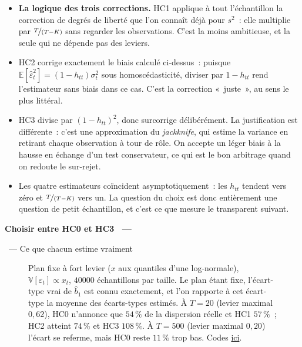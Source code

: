 \documentclass[10pt,a4paper]{article}
\makeatletter
\newcommand{\coursfile}{chapitre-4}
\newcommand{\HEAD}{HEAD}%
\newcommand{\repourl}{https://github.com/stepan-a/econometrics}
\newcommand{\coderef}[1]{\href{\repourl/blob/\HEAD/routines/\coursfile/#1}{ici}}
\theoremstyle{definition}
\renewcommand{\newline}{\unskip\par\vspace{1.5pt}}
\newenvironment{frame}[1][]{\par}{\par}
\newcommand{\frameheadrule}{%
  \par\nobreak\vspace{1pt}{\color{ctitle}\hrule height 0.6pt}\nobreak\vspace{4pt}}
\newcommand{\frametitle}[1]{%
  \par\addvspace{8pt plus 2pt}\needspace{6\baselineskip}%
  \noindent\begingroup\color{ctitle}\sffamily\bfseries\large #1\endgroup
  \@ifnextchar\framesubtitle{}{\frameheadrule}}
\newcommand{\framesubtitle}[1]{%
  \begingroup\color{ctitle}\sffamily\normalsize\ --- #1\endgroup\frameheadrule}
\makeatother
\begin{document}
\begin{notes}

  \begin{itemize}

  \item \textbf{La logique des trois corrections.} HC1 applique à tout
    l'échantillon la correction de degrés de liberté que l'on connaît déjà pour
    $s^2$~: elle multiplie par $\nicefrac{T}{(T-K)}$ sans regarder les
    observations. C'est la moins ambitieuse, et la seule qui ne dépende pas des
    leviers.\newline

  \item HC2 corrige exactement le biais calculé ci-dessus~: puisque
    $\mathbb E[\hat\varepsilon_t^2] = (1-h_{tt})\sigma_t^2$ sous
    homoscédasticité, diviser par $1-h_{tt}$ rend l'estimateur sans biais dans
    ce cas. C'est la correction «~juste~», au sens le plus littéral.\newline

  \item HC3 divise par $(1-h_{tt})^2$, donc surcorrige délibérément. La
    justification est différente~: c'est une approximation du \emph{jackknife},
    qui estime la variance en retirant chaque observation à tour de rôle. On
    accepte un léger biais à la hausse en échange d'un test conservateur, ce qui
    est le bon arbitrage quand on redoute le sur-rejet.\newline

  \item Les quatre estimateurs coïncident asymptotiquement~: les $h_{tt}$
    tendent vers zéro et $\nicefrac{T}{(T-K)}$ vers un. La question du choix est
    donc entièrement une question de petit échantillon, et c'est ce que mesure
    le transparent suivant.

  \end{itemize}

\end{notes}


\begin{frame}[c]
  \frametitle{Choisir entre HC0 et HC3}
  \framesubtitle{Ce que chacun estime vraiment}

  \begin{figure}
    \centering
    \caption{Plan fixe à fort levier ($x$ aux quantiles d'une log-normale),
      $\mathbb V[\varepsilon_t]\propto x_t$, $40000$ échantillons par taille. Le
      plan étant fixe, l'écart-type vrai de $\hat b_1$ est connu exactement, et
      l'on rapporte à cet écart-type la moyenne des écarts-types estimés. À
      $T=20$ (levier maximal $0{,}62$), HC0 n'annonce que $54\,\%$ de la
      dispersion réelle et HC1 $57\,\%$~; HC2 atteint $74\,\%$ et HC3 $108\,\%$.
      À $T=500$ (levier maximal $0{,}20$) l'écart se referme, mais HC0 reste
      $11\,\%$ trop bas. Codes \coderef{hc-petit-echantillon.py}.}
  \end{figure}

\end{frame}
\end{document}
